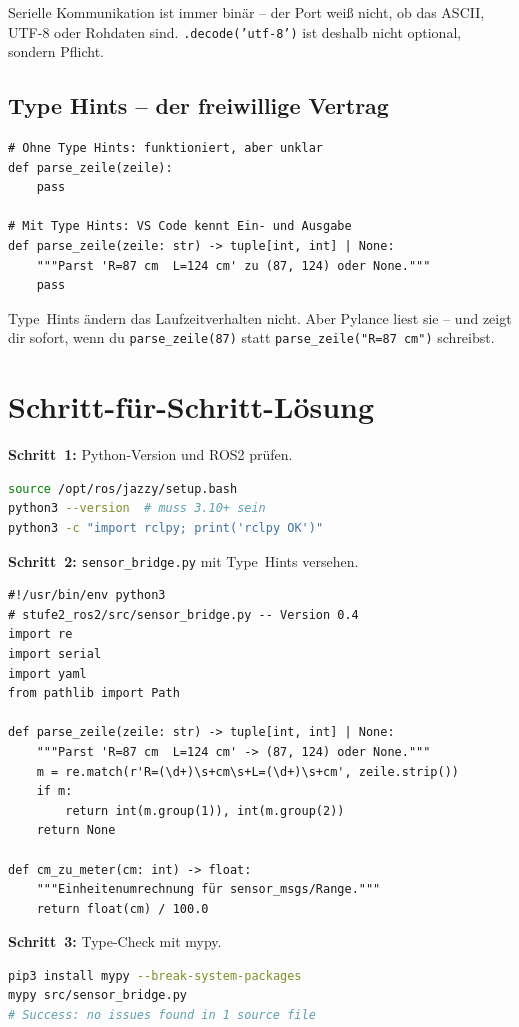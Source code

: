 Serielle Kommunikation ist immer binär -- der Port weiß nicht,
ob das ASCII, UTF-8 oder Rohdaten sind.
\texttt{.decode('utf-8')} ist deshalb nicht optional,
sondern Pflicht.

\subsection{Type Hints -- der freiwillige Vertrag}

\begin{lstlisting}
# Ohne Type Hints: funktioniert, aber unklar
def parse_zeile(zeile):
    pass

# Mit Type Hints: VS Code kennt Ein- und Ausgabe
def parse_zeile(zeile: str) -> tuple[int, int] | None:
    """Parst 'R=87 cm  L=124 cm' zu (87, 124) oder None."""
    pass
\end{lstlisting}

Type~Hints ändern das Laufzeitverhalten nicht.
Aber Pylance liest sie -- und zeigt dir sofort, wenn du
\texttt{parse\_zeile(87)} statt \texttt{parse\_zeile("R=87 cm")} schreibst.

\section{Schritt-für-Schritt-Lösung}

\begin{loesungBox}
\textbf{Schritt~1:} Python-Version und ROS2 prüfen.
\begin{lstlisting}[language=bash]
source /opt/ros/jazzy/setup.bash
python3 --version  # muss 3.10+ sein
python3 -c "import rclpy; print('rclpy OK')"
\end{lstlisting}

\textbf{Schritt~2:} \texttt{sensor\_bridge.py} mit Type~Hints versehen.
\begin{lstlisting}
#!/usr/bin/env python3
# stufe2_ros2/src/sensor_bridge.py -- Version 0.4
import re
import serial
import yaml
from pathlib import Path

def parse_zeile(zeile: str) -> tuple[int, int] | None:
    """Parst 'R=87 cm  L=124 cm' -> (87, 124) oder None."""
    m = re.match(r'R=(\d+)\s+cm\s+L=(\d+)\s+cm', zeile.strip())
    if m:
        return int(m.group(1)), int(m.group(2))
    return None

def cm_zu_meter(cm: int) -> float:
    """Einheitenumrechnung für sensor_msgs/Range."""
    return float(cm) / 100.0
\end{lstlisting}

\textbf{Schritt~3:} Type-Check mit mypy.
\begin{lstlisting}[language=bash]
pip3 install mypy --break-system-packages
mypy src/sensor_bridge.py
# Success: no issues found in 1 source file
\end{lstlisting}
\end{loesungBox}

